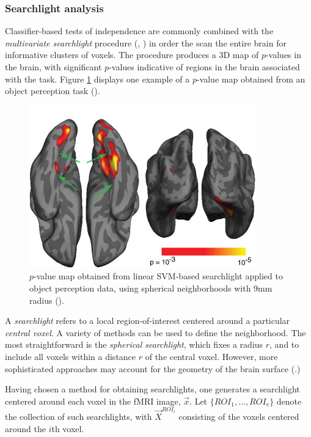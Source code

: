 \subsubsection{Searchlight analysis}

Classifier-based tests of independence are commonly combined with the
\emph{multivariate searchlight} procedure
(\cite{kriegeskorte2006information}, \cite{kriegeskorte2007analyzing})
in order the scan the entire brain for informative clusters of voxels.
The procedure produces a 3D map of $p$-values in the brain, with
significant $p$-values indicative of regions in the brain associated
with the task.  Figure \ref{fig:searchlight_example} displays one
example of a $p$-value map obtained from an object perception task (\cite{chen2011cortical}).

\begin{figure}
\centering
\includegraphics[scale = 0.5]{Figures/chen2010_cropped.png}
\caption{$p$-value map obtained from linear SVM-based searchlight
  applied to object perception data, using spherical neighborhoods
  with 9mm radius (\cite{chen2011cortical}).}
\label{fig:searchlight_example}
\end{figure}

A \emph{searchlight} refers to a local region-of-interest centered
around a particular \emph{central voxel}.  A variety of methods can be
used to define the neighborhood.  The most straightforward is the
\emph{spherical searchlight}, which fixes a radius $r$, and to include
all voxels within a distance $r$ of the central voxel.  However, more
sophisticated approaches may account for the geometry of the brain
surface (\cite{chen2011cortical}.)

Having chosen a method for obtaining searchlights, one generates a
searchlight centered around each voxel in the fMRI image, $\vec{x}$.
Let $\{ROI_1,\hdots, ROI_v\}$ denote the collection of such
searchlights, with $\vec{X}^{ROI_i}$ consisting of the voxels centered
around the $i$th voxel.

